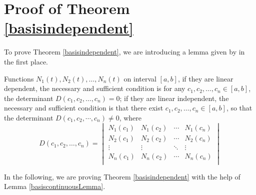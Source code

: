 \section{Proof of Theorem \ref{basisindependent}}\label{AppendixBasisproof}

To prove Theorem \ref{basisindependent}, we are introducing a lemma given by \cite{Peng1983linear} in the first place. 

\begin{lemma}\label{basiscontinuousLemma}
Functions $N_1(t),N_2(t),\ldots,N_n(t)$ on interval $[a,b]$, if they are linear dependent, the necessary and sufficient condition is for any $c_1,c_2,\ldots,c_n \in [a,b]$, the determinant $D(c_1,c_2,\ldots,c_n)=0$; if they are linear independent, the necessary and sufficient condition is that there exist $c_1,c_2,\ldots,c_n \in [a,b]$, so that the determinant $D(c_1,c_2,\cdots,c_n) \neq 0$, where 
\begin{equation*}
D(c_1,c_2,\ldots,c_n)=
\begin{vmatrix}
N_1(c_1) & N_1(c_2) & \cdots& N_1(c_n)\\
N_2(c_1) & N_2(c_2)& \cdots & N_2(c_n)\\
 \vdots  &  \vdots  & \ddots  & \vdots  \\  
N_n(c_1) & N_n(c_2) & \cdots & N_n(c_n)\\
\end{vmatrix}
\end{equation*}
\end{lemma}

In the following, we are proving Theorem \ref{basisindependent} with the help of Lemma \ref{basiscontinuousLemma}. 

